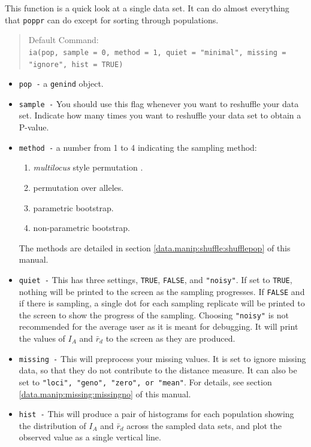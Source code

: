 \documentclass[letterpaper]{article}
\newcommand{\tab}{\hspace*{1em}}
\begin{document}
\tab\tab This function is a quick look at a single data set. It can do almost everything that \texttt{poppr} can do except for sorting through populations.
\begin{quote}
Default Command:\\
\texttt{ia(pop, sample = 0, method = 1, quiet = "minimal", missing = "ignore", hist = TRUE)}
\end{quote}
\begin{itemize}
  \item \texttt{pop -} a \texttt{genind} object.
  \item \texttt{sample -} You should use this flag whenever you want to reshuffle your data set. Indicate how many times you want to reshuffle your data set to obtain a P-value. 
  \item \texttt{method -} a number from 1 to 4 indicating the sampling method:
  \begin{enumerate}
    \item \textit{multilocus} style permutation \cite{Agapow:2001}.
    \item permutation over alleles.
    \item parametric bootstrap.
    \item non-parametric bootstrap.
  \end{enumerate}
  The methods are detailed in section \ref{data.manip:shuffle:shufflepop} of this manual.
  \item \texttt{quiet -} This has three settings, \texttt{TRUE}, \texttt{FALSE}, and \texttt{"noisy"}. If set to \texttt{TRUE}, nothing will be printed to the screen as the sampling progresses. If \texttt{FALSE} and if there is sampling, a single dot for each sampling replicate will be printed to the screen to show the progress of the sampling. Choosing \texttt{"noisy"} is not recommended for the average user as it is meant for debugging. It will print the values of $I_A$ and $\bar r_d$ to the screen as they are produced. 
  \item \texttt{missing -} This will preprocess your missing values. It is set to ignore missing data, so that they do not contribute to the distance measure. It can also be set to \texttt{"loci", "geno", "zero", or "mean"}. For details, see section \ref{data.manip:missing:missingno} of this manual.
  \item \texttt{hist -} This will produce a pair of histograms for each population showing the distribution of $I_A$ and $\bar r_d$ across the sampled data sets, and plot the observed value as a single vertical line.
\end{itemize}
\end{document}
